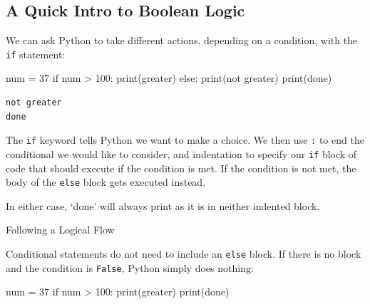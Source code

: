 \documentclass[
  letterpaper,
  DIV=11,
  numbers=noendperiod]{scrreprt}
\newenvironment{Shaded}{\begin{snugshade}}{\end{snugshade}}
\newcommand{\BuiltInTok}[1]{\textcolor[rgb]{0.00,0.23,0.31}{#1}}
\newcommand{\ControlFlowTok}[1]{\textcolor[rgb]{0.00,0.23,0.31}{#1}}
\newcommand{\DecValTok}[1]{\textcolor[rgb]{0.68,0.00,0.00}{#1}}
\newcommand{\NormalTok}[1]{\textcolor[rgb]{0.00,0.23,0.31}{#1}}
\newcommand{\OperatorTok}[1]{\textcolor[rgb]{0.37,0.37,0.37}{#1}}
\newcommand{\StringTok}[1]{\textcolor[rgb]{0.13,0.47,0.30}{#1}}
\begin{document}
\hypertarget{a-quick-intro-to-boolean-logic}{%
\subsection{A Quick Intro to Boolean
Logic}\label{a-quick-intro-to-boolean-logic}}

We can ask Python to take different actions, depending on a condition,
with the \texttt{if} statement:

\begin{Shaded}
\begin{Highlighting}[]
\NormalTok{num }\OperatorTok{=} \DecValTok{37}
\ControlFlowTok{if}\NormalTok{ num }\OperatorTok{\textgreater{}} \DecValTok{100}\NormalTok{:}
    \BuiltInTok{print}\NormalTok{(}\StringTok{\textquotesingle{}greater\textquotesingle{}}\NormalTok{)}
\ControlFlowTok{else}\NormalTok{:}
    \BuiltInTok{print}\NormalTok{(}\StringTok{\textquotesingle{}not greater\textquotesingle{}}\NormalTok{)}
\BuiltInTok{print}\NormalTok{(}\StringTok{\textquotesingle{}done\textquotesingle{}}\NormalTok{)}
\end{Highlighting}
\end{Shaded}

\begin{verbatim}
not greater
done
\end{verbatim}

The \texttt{if} keyword tells Python we want to make a choice. We then
use \texttt{:} to end the conditional we would like to consider, and
indentation to specify our \texttt{if} block of code that should execute
if the condition is met. If the condition is not met, the body of the
\texttt{else} block gets executed instead.

In either case, `done' will always print as it is in neither indented
block.

Following a Logical Flow

Conditional statements do not need to include an \texttt{else} block. If
there is no block and the condition is \texttt{False}, Python simply
does nothing:

\begin{Shaded}
\begin{Highlighting}[]
\NormalTok{num }\OperatorTok{=} \DecValTok{37}
\ControlFlowTok{if}\NormalTok{ num }\OperatorTok{\textgreater{}} \DecValTok{100}\NormalTok{:}
    \BuiltInTok{print}\NormalTok{(}\StringTok{\textquotesingle{}greater\textquotesingle{}}\NormalTok{)}
\BuiltInTok{print}\NormalTok{(}\StringTok{\textquotesingle{}done\textquotesingle{}}\NormalTok{)}
\end{Highlighting}
\end{Shaded}
\end{document}
